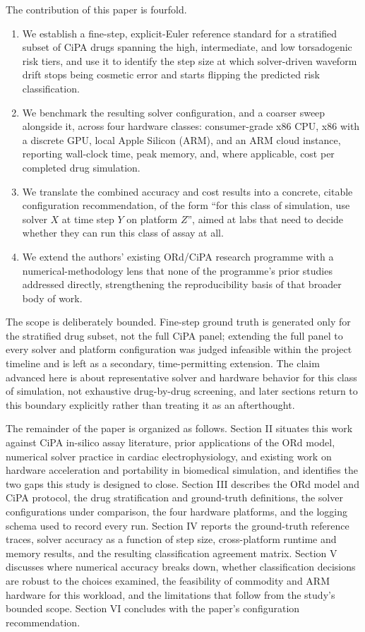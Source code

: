 \documentclass[journal]{IEEEtran}
\begin{document}
The contribution of this paper is fourfold.

\begin{enumerate}
\item We establish a fine-step, explicit-Euler reference standard for a stratified subset of CiPA drugs spanning the high, intermediate, and low torsadogenic risk tiers, and use it to identify the step size at which solver-driven waveform drift stops being cosmetic error and starts flipping the predicted risk classification.
\item We benchmark the resulting solver configuration, and a coarser sweep alongside it, across four hardware classes: consumer-grade x86 CPU, x86 with a discrete GPU, local Apple Silicon (ARM), and an ARM cloud instance, reporting wall-clock time, peak memory, and, where applicable, cost per completed drug simulation.
\item We translate the combined accuracy and cost results into a concrete, citable configuration recommendation, of the form ``for this class of simulation, use solver $X$ at time step $Y$ on platform $Z$'', aimed at labs that need to decide whether they can run this class of assay at all.
\item We extend the authors' existing ORd/CiPA research programme with a numerical-methodology lens that none of the programme's prior studies addressed directly, strengthening the reproducibility basis of that broader body of work.
\end{enumerate}

The scope is deliberately bounded. Fine-step ground truth is generated only for the stratified drug subset, not the full CiPA panel; extending the full panel to every solver and platform configuration was judged infeasible within the project timeline and is left as a secondary, time-permitting extension. The claim advanced here is about representative solver and hardware behavior for this class of simulation, not exhaustive drug-by-drug screening, and later sections return to this boundary explicitly rather than treating it as an afterthought.

The remainder of the paper is organized as follows. Section II situates this work against CiPA in-silico assay literature, prior applications of the ORd model, numerical solver practice in cardiac electrophysiology, and existing work on hardware acceleration and portability in biomedical simulation, and identifies the two gaps this study is designed to close. Section III describes the ORd model and CiPA protocol, the drug stratification and ground-truth definitions, the solver configurations under comparison, the four hardware platforms, and the logging schema used to record every run. Section IV reports the ground-truth reference traces, solver accuracy as a function of step size, cross-platform runtime and memory results, and the resulting classification agreement matrix. Section V discusses where numerical accuracy breaks down, whether classification decisions are robust to the choices examined, the feasibility of commodity and ARM hardware for this workload, and the limitations that follow from the study's bounded scope. Section VI concludes with the paper's configuration recommendation.
\end{document}
